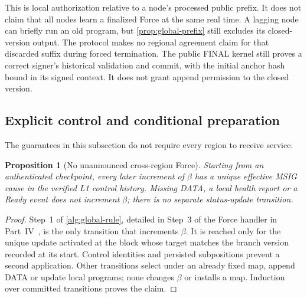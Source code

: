 \documentclass[11pt,a4paper]{article}
\newtheorem{proposition}[proposition]{Proposition}
\newcounter{protocol}
\begin{document}
This is local authorization relative to a node's processed public
prefix. It does not claim that all nodes learn a finalized Force at the
same real time. A lagging node can briefly run an old program, but
\cref{prop:global-prefix} still excludes its closed-version output.
The protocol makes no regional agreement claim for that discarded
suffix during forced termination. The public FINAL kernel still proves
a correct signer's historical validation and commit, with the initial
anchor hash bound in its signed context. It does not grant append
permission to the closed version.
\subsection{Explicit control and conditional preparation}
\label{sec:liveness}
The guarantees in this subsection do not require every region to receive
service.

\begin{proposition}[No unannounced cross-region Force]
\label{prop:explicit-force}
Starting from an authenticated checkpoint, every later increment of
$\beta$ has a unique effective MSIG cause in the verified L1 control
history. Missing DATA, a local health report or a Ready event does not
increment $\beta$; there is no separate status-update transition.
\end{proposition}
\begin{proof}
Step~1 of \cref{alg:global-rule}, detailed in Step~3 of
the Force handler in Part~IV~\cite{part4}, is the only transition that increments $\beta$.
It is reached only for the unique update activated at the block
whose target matches the branch version recorded at its start. Control identities
and persisted subpositions prevent a second application. Other
transitions select under an already fixed map, append DATA or update
local programs; none changes $\beta$ or installs a map. Induction over committed
transitions proves the claim.
\end{proof}
\end{document}
